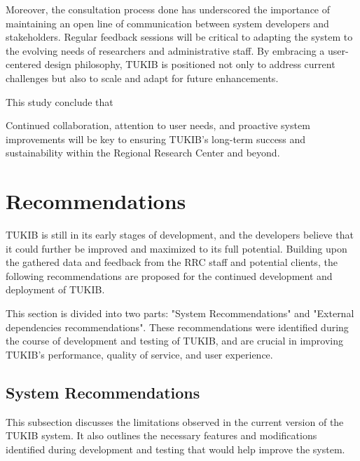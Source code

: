 Moreover, the consultation process done has underscored the importance of maintaining an open line of communication between system developers and stakeholders. Regular feedback sessions will be critical to adapting the system to the evolving needs of researchers and administrative staff. By embracing a user-centered design philosophy, TUKIB is positioned not only to address current challenges but also to scale and adapt for future enhancements.

This study conclude that 

Continued collaboration, attention to user needs, and proactive system improvements will be key to ensuring TUKIB’s long-term success and sustainability within the Regional Research Center and beyond.

\section{Recommendations}

TUKIB is still in its early stages of development, and the developers believe
that it could further be improved and maximized to its full potential. Building upon the gathered data and feedback from the RRC staff and potential clients, the following recommendations are proposed for the continued development and deployment of TUKIB. 

This section is divided into two parts: "System Recommendations" and "External dependencies recommendations". These recommendations were identified during the course of development and testing of TUKIB, and are crucial in improving TUKIB's performance, quality of service, and user experience.

\subsection{System Recommendations}

This subsection discusses the limitations observed in the current version of the TUKIB system. It also outlines the necessary features and modifications identified during development and testing that would help improve the system.

